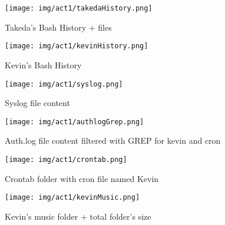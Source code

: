 \documentclass[a4paper,12pt]{article}
\begin{document}
\begin{figure}[H]
	\begin{center}
		\texttt{[image: img/act1/takedaHistory.png]} 
	\end{center}
	\caption{Takeda's Bash History + files}
	\label{takedaBash}
\end{figure}


\begin{figure}[H]
	\begin{center}
		\texttt{[image: img/act1/kevinHistory.png]} 
	\end{center}
	\caption{Kevin's Bash History}
	\label{kevinBash}
\end{figure}




\begin{figure}[H]
	\begin{center}
		\texttt{[image: img/act1/syslog.png]} 
	\end{center}
	\caption{Syslog file content}
	\label{syslog}
\end{figure}


\begin{figure}[H]
	\begin{center}
		\texttt{[image: img/act1/authlogGrep.png]} 
	\end{center}
	\caption{Auth.log file content filtered with GREP for kevin and cron}
	\label{authlog}
\end{figure}

\begin{figure}[H]
	\begin{center}
		\texttt{[image: img/act1/crontab.png]} 
	\end{center}
	\caption{Crontab folder with cron file named Kevin}
	\label{crontab}
\end{figure}

\begin{figure}[H]
	\begin{center}
		\texttt{[image: img/act1/kevinMusic.png]} 
	\end{center}
	\caption{Kevin's music folder + total folder's size}
	\label{kevinMusic}
\end{figure}

%
%
\end{document}

